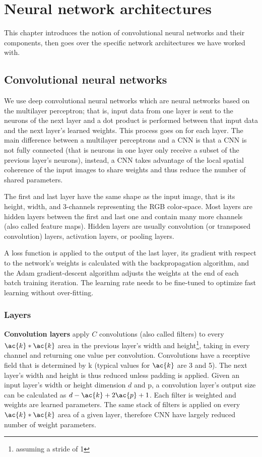 \chapter{Neural network architectures}

This chapter introduces the notion of convolutional neural networks and their components, then goes over the specific network architectures we have worked with.

\section{Convolutional neural networks}

We use deep convolutional neural networks which are neural networks based on the multilayer perceptron; that is, input data from one layer is sent to the neurons of the next layer and a dot product is performed between that input data and the next layer's learned weights. This process goes on for each layer. The main difference between a multilayer perceptrons and a \ac{CNN} is that a \ac{CNN} is not fully connected (that is neurons in one layer only receive a subset of the previous layer's neurons), instead, a \ac{CNN} takes advantage of the local spatial coherence of the input images to share weights and thus reduce the number of shared parameters.

The first and last layer have the same shape as the input image, that is its height, width, and 3-channels representing the RGB color-space. Most layers are hidden layers between the first and last one and contain many more channels (also called feature maps). Hidden layers are usually convolution (or transposed convolution) layers, activation layers, or pooling layers.

A loss function is applied to the output of the last layer, its gradient with respect to the network's weights is calculated with the backpropagation algorithm, and the Adam gradient-descent algorithm\cite{adam} adjusts the weights at the end of each batch training iteration. The learning rate needs to be fine-tuned to optimize fast learning without over-fitting.

\subsection{Layers}

\textbf{Convolution layers} apply $C$ convolutions (also called filters) to every $\ac{k}*\ac{k}$ area in the previous layer's width and height\footnote{assuming a stride of 1}, taking in every channel and returning one value per convolution. Convolutions have a receptive field that is determined by \ac{k} (typical values for $\ac{k}$ are 3 and 5). The next layer's width and height is thus reduced unless padding is applied. Given an input layer's width or height dimension $d$ and \ac{p}, a convolution layer's output size can be calculated as $d-\ac{k}+2\ac{p}+1$. Each filter is weighted and weights are learned parameters. The same stack of filters is applied on every $\ac{k}*\ac{k}$ area of a given layer, therefore \acs{CNN} have largely reduced number of weight parameters.

